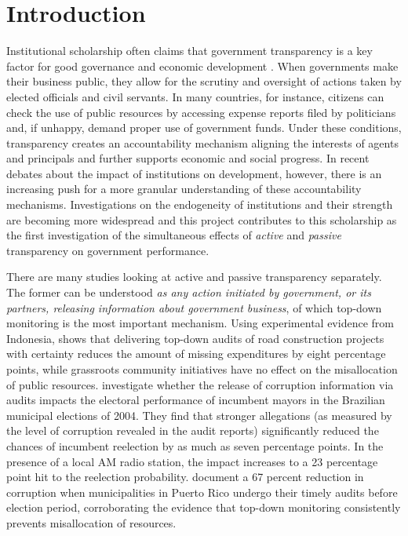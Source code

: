 \documentclass[11pt]{article}
\begin{document}
\clearpage

\section{Introduction} \label{sec:introduction_paper3}

Institutional scholarship often claims that government transparency is a key factor for good governance and economic development \citep{KaufmannGovernanceMatters1999,BoRothsteinGoodGovernance2012}. When governments make their business public, they allow for the scrutiny and oversight of actions taken by elected officials and civil servants. In many countries, for instance, citizens can check the use of public resources by accessing expense reports filed by politicians and, if unhappy, demand proper use of government funds. Under these conditions, transparency creates an accountability mechanism aligning the interests of agents and principals and further supports economic and social progress. In recent debates about the impact of institutions on development, however, there is an increasing push for a more granular understanding of these accountability mechanisms. Investigations on the endogeneity of institutions and their strength \citep{AcemogluChapterInstitutionsFundamental2005,LevitskyVariationInstitutionalStrength2009,DalBoInstitutionsBehaviorExperimental2010} are becoming more widespread and this project contributes to this scholarship as the first investigation of the simultaneous effects of \emph{active} and \emph{passive} transparency on government performance.

There are many studies looking at active and passive transparency separately. The former can be understood \emph{as any action initiated by government, or its partners, releasing information about government business}, of which top-down monitoring is the most important mechanism. Using experimental evidence from Indonesia, \citet{OlkenMonitoringCorruptionEvidence2007c} shows that delivering top-down audits of road construction projects with certainty reduces the amount of missing expenditures by eight percentage points, while grassroots community initiatives have no effect on the misallocation of public resources. \citet{FerrazExposingCorruptPoliticians2008b} investigate whether the release of corruption information via audits impacts the electoral performance of incumbent mayors in the Brazilian municipal elections of 2004. They find that stronger allegations (as measured by the level of corruption revealed in the audit reports) significantly reduced the chances of incumbent reelection by as much as seven percentage points. In the presence of a local AM radio station, the impact increases to a 23 percentage point hit to the reelection probability. \citet{BobonisMonitoringCorruptiblePoliticians2016} document a 67 percent reduction in corruption when municipalities in Puerto Rico undergo their timely audits before election period, corroborating the evidence that top-down monitoring consistently prevents misallocation of resources.
\end{document}
